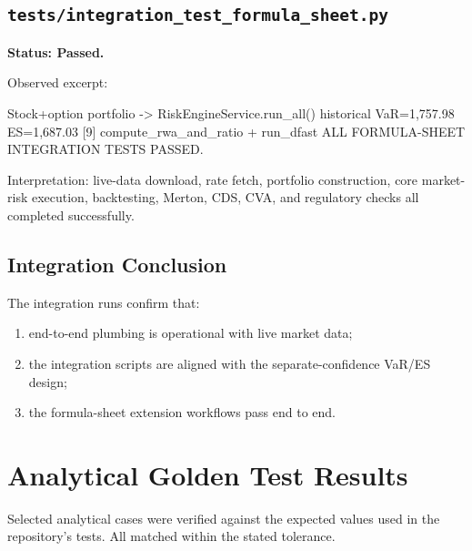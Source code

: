 \documentclass[11pt]{article}
\newcommand{\code}[1]{\texttt{#1}}
\begin{document}
\subsection{\code{tests/integration\_test\_formula\_sheet.py}}

\textbf{Status: Passed.}

Observed excerpt:
\begin{shellcode}
[3] Stock+option portfolio -> RiskEngineService.run_all()
    historical   VaR=1,757.98  ES=1,687.03
[9] compute_rwa_and_ratio + run_dfast
ALL FORMULA-SHEET INTEGRATION TESTS PASSED.
\end{shellcode}

Interpretation: live-data download, rate fetch, portfolio construction,
core market-risk execution, backtesting, Merton, CDS, CVA, and regulatory
checks all completed successfully.

\subsection{Integration Conclusion}

The integration runs confirm that:
\begin{enumerate}
  \item end-to-end plumbing is operational with live market data;
  \item the integration scripts are aligned with the separate-confidence VaR/ES design;
  \item the formula-sheet extension workflows pass end to end.
\end{enumerate}

\section{Analytical Golden Test Results}

Selected analytical cases were verified against the expected values used
in the repository's tests.  All matched within the stated tolerance.
\end{document}
